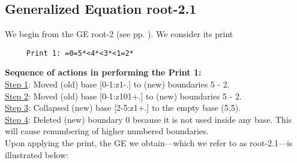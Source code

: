 \documentclass[final]{article}
\begin{document}
\subsection*{Generalized Equation root-2.1}
\label{root-2.1}We begin from the GE root-2 (see pp. \pageref{root-2}).  {We consider its print}
\begin{verbatim}
     Print 1: =0=5*<4*<3*<1=2*
\end{verbatim}
{\bf Sequence of actions in performing the Print 1:}\\
{\underline{Step 1}:} Moved (old) base [0-1:z1-.]  to (new) boundaries 5 - 2.\\
{\underline{Step 2}:} Moved (old) base [0-1:z101+.]  to (new) boundaries 5 - 2.\\
{\underline{Step 3}:} Collapsed (new) base [2-5:z1+.]  to the empty base (5,5).
\\
{\underline{Step 4}:} Deleted (new) boundary 0 because it is not used inside any base.  This will cause renumbering of higher numbered boundaries.
\\[0.1in]
{Upon applying the print, the GE we obtain---which we refer to as root-2.1---is illustrated below:}
\end{document}
